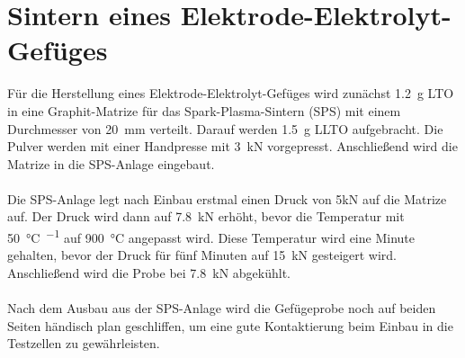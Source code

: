 \documentclass[a4paper, 11pt, headsepline,footsepline,twoside,abstract]{scrbook}
\begin{document}
\section{Sintern eines Elektrode-Elektrolyt-Gefüges}
Für die Herstellung eines Elektrode-Elektrolyt-Gefüges wird zunächst \SI{1.2}{\gram} LTO in eine Graphit-Matrize für das Spark-Plasma-Sintern (SPS) mit einem Durchmesser von \SI{20}{\milli\metre} verteilt. Darauf werden \SI{1.5}{\gram} LLTO aufgebracht. Die Pulver werden mit einer Handpresse mit \SI{3}{\kilo\newton} vorgepresst. Anschließend wird die Matrize in die SPS-Anlage eingebaut. 
\\\\
Die SPS-Anlage legt nach Einbau erstmal einen Druck von 5kN auf die Matrize auf. Der Druck wird dann auf \SI{7.8}{\kilo\newton} erhöht, bevor die Temperatur mit \SI{50}{\celsius\per\min} auf \SI{900}{\celsius} angepasst wird. Diese Temperatur wird eine Minute gehalten, bevor der Druck für fünf Minuten auf \SI{15}{\kilo\newton} gesteigert wird. Anschließend wird die Probe bei \SI{7.8}{\kilo\newton} abgekühlt. 
\\\\
Nach dem Ausbau aus der SPS-Anlage wird die Gefügeprobe noch auf beiden Seiten händisch plan geschliffen, um eine gute Kontaktierung beim Einbau in die Testzellen zu gewährleisten.
\end{document}
